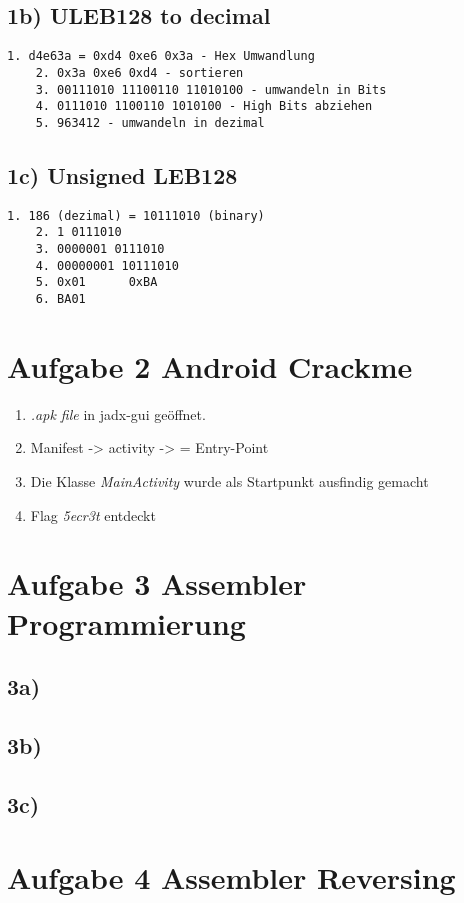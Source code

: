 \subsection*{1b) ULEB128 to decimal}

\begin{lstlisting}[]
    1. d4e63a = 0xd4 0xe6 0x3a - Hex Umwandlung
    2. 0x3a 0xe6 0xd4 - sortieren
    3. 00111010 11100110 11010100 - umwandeln in Bits
    4. 0111010 1100110 1010100 - High Bits abziehen
    5. 963412 - umwandeln in dezimal
\end{lstlisting}

\subsection*{1c) Unsigned LEB128}

\begin{lstlisting}[]
    1. 186 (dezimal) = 10111010 (binary)
    2. 1 0111010
    3. 0000001 0111010
    4. 00000001 10111010
    5. 0x01      0xBA
    6. BA01
\end{lstlisting}

\section*{Aufgabe 2 Android Crackme}

\begin{enumerate}
    \item \textit{.apk file} in jadx-gui geöffnet.
    \item Manifest -> activity -> = Entry-Point
    \item Die Klasse \textit{MainActivity} wurde als Startpunkt ausfindig gemacht
    \item Flag \textit{5ecr3t} entdeckt
\end{enumerate}



\section*{Aufgabe 3 Assembler Programmierung}

\subsection*{3a)}

\subsection*{3b)}

\subsection*{3c)}


\section*{Aufgabe 4 Assembler Reversing}



